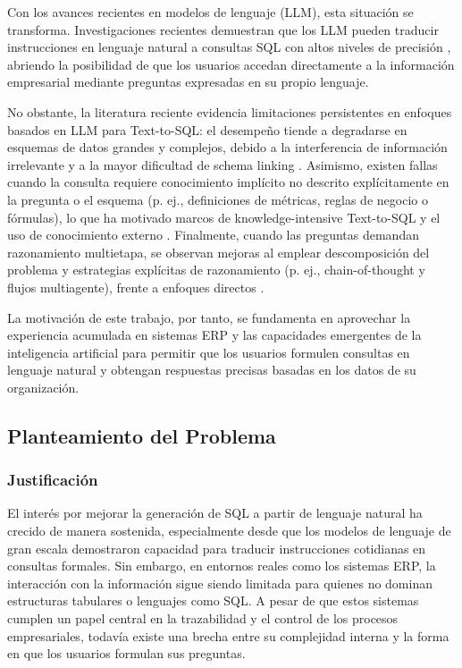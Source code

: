\documentclass[journal]{IEEEtran}
\begin{document}
Con los avances recientes en modelos de lenguaje (LLM), esta situación se transforma. Investigaciones recientes demuestran que los LLM pueden traducir instrucciones en lenguaje natural a consultas SQL con altos niveles de precisión \cite{pourreza2023din}, abriendo la posibilidad de que los usuarios accedan directamente a la información empresarial mediante preguntas expresadas en su propio lenguaje.

No obstante, la literatura reciente evidencia limitaciones persistentes en enfoques basados en LLM para Text-to-SQL: el desempeño tiende a degradarse en esquemas de datos grandes y complejos, debido a la interferencia de información irrelevante y a la mayor dificultad de schema linking \cite{gan2021natural, hong2024bird, li2024comprehensive}. Asimismo, existen fallas cuando la consulta requiere conocimiento implícito no descrito explícitamente en la pregunta o el esquema (p. ej., definiciones de métricas, reglas de negocio o fórmulas), lo que ha motivado marcos de knowledge-intensive Text-to-SQL y el uso de conocimiento externo \cite{dou2022towards, hong2024knowledge}. Finalmente, cuando las preguntas demandan razonamiento multietapa, se observan mejoras al emplear descomposición del problema y estrategias explícitas de razonamiento (p. ej., chain-of-thought y flujos multiagente), frente a enfoques directos \cite{pourreza2023din, li2024comprehensive, wang2025mac, zhang2023act}.

La motivación de este trabajo, por tanto, se fundamenta en aprovechar la experiencia acumulada en sistemas ERP y las capacidades emergentes de la inteligencia artificial para permitir que los usuarios formulen consultas en lenguaje natural y obtengan respuestas precisas basadas en los datos de su organización.

\subsection{Planteamiento del Problema}

\subsubsection{Justificación}

El interés por mejorar la generación de SQL a partir de lenguaje natural ha crecido de manera sostenida, especialmente desde que los modelos de lenguaje de gran escala demostraron capacidad para traducir instrucciones cotidianas en consultas formales. Sin embargo, en entornos reales como los sistemas ERP, la interacción con la información sigue siendo limitada para quienes no dominan estructuras tabulares o lenguajes como SQL. A pesar de que estos sistemas cumplen un papel central en la trazabilidad y el control de los procesos empresariales, todavía existe una brecha entre su complejidad interna y la forma en que los usuarios formulan sus preguntas.
\end{document}
